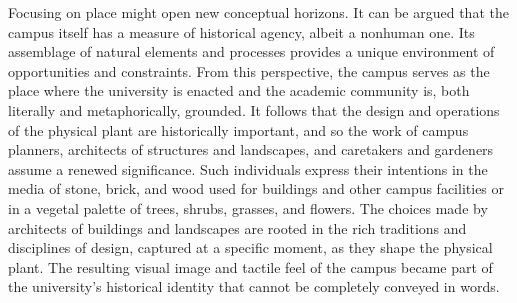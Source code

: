 \documentclass[
  american,
  letterpaper,
]{scrreprt}
\begin{document}
Focusing on place might open new conceptual horizons. It can be argued
that the campus itself has a measure of historical agency, albeit a
nonhuman one. Its assemblage of natural elements and processes provides
a unique environment of opportunities and constraints. From this
perspective, the campus serves as the place where the university is
enacted and the academic community is, both literally and
metaphorically, grounded. It follows that the design and operations of
the physical plant are historically important, and so the work of campus
planners, architects of structures and landscapes, and caretakers and
gardeners assume a renewed significance. Such individuals express their
intentions in the media of stone, brick, and wood used for buildings and
other campus facilities or in a vegetal palette of trees, shrubs,
grasses, and flowers. The choices made by architects of buildings and
landscapes are rooted in the rich traditions and disciplines of design,
captured at a specific moment, as they shape the physical plant. The
resulting visual image and tactile feel of the campus became part of the
university's historical identity that cannot be completely conveyed in
words.
\end{document}
